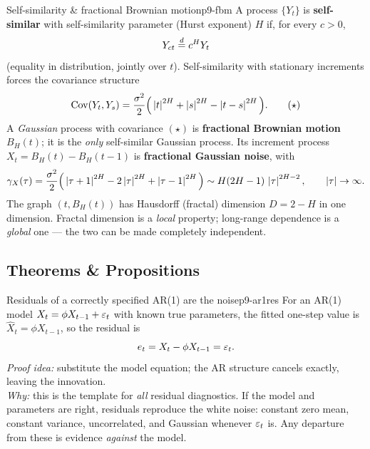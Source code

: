 \begin{definition}{Self-similarity \& fractional Brownian motion}{p9-fbm}
A process $\{Y_t\}$ is \textbf{self-similar} with self-similarity parameter
(Hurst exponent) $H$ if, for every $c>0$,
\[
Y_{ct} \overset{d}{=} c^{H} Y_t
\]
(equality in distribution, jointly over $t$). Self-similarity with stationary
increments forces the covariance structure
\[
\operatorname{Cov}(Y_t,Y_s) = \frac{\sigma^2}{2}\Big(\left\lvert t \right\rvert^{2H}+\left\lvert s \right\rvert^{2H}-\left\lvert t-s \right\rvert^{2H}\Big).
\tag{$\star$}
\]
A \emph{Gaussian} process with covariance $(\star)$ is \textbf{fractional
Brownian motion} $B_H(t)$; it is the \emph{only} self-similar Gaussian process.
Its increment process $X_t=B_H(t)-B_H(t-1)$ is \textbf{fractional Gaussian
noise}, with
\[
\gamma_X(\tau)=\frac{\sigma^2}{2}\Big(\left\lvert \tau+1 \right\rvert^{2H}-2\left\lvert \tau \right\rvert^{2H}+\left\lvert \tau-1 \right\rvert^{2H}\Big)
\sim H(2H-1)\,\left\lvert \tau \right\rvert^{2H-2},\qquad\left\lvert \tau \right\rvert\to\infty .
\]
The graph $(t,B_H(t))$ has Hausdorff (fractal) dimension $D=2-H$ in one
dimension. Fractal dimension is a \emph{local} property; long-range dependence
is a \emph{global} one --- the two can be made completely independent.
\end{definition}

\subsection{Theorems \& Propositions}

\begin{proposition}{Residuals of a correctly specified AR(1) are the noise}{p9-ar1res}
For an AR(1) model $X_t=\phi X_{t-1}+\varepsilon_t$ with known true parameters, the
fitted one-step value is $\hat X_t=\phi X_{t-1}$, so the residual is
\[
e_t = X_t - \phi X_{t-1} = \varepsilon_t .
\]
\textit{Proof idea:} substitute the model equation; the AR structure cancels
exactly, leaving the innovation.\\
\textit{Why:} this is the template for \emph{all} residual diagnostics. If the
model and parameters are right, residuals reproduce the white noise: constant
zero mean, constant variance, uncorrelated, and Gaussian whenever $\varepsilon_t$ is.
Any departure from these is evidence \emph{against} the model.
\end{proposition}

